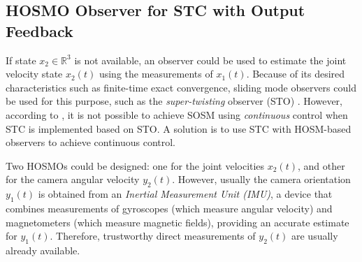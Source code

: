 \subsection{HOSMO Observer for STC with Output Feedback}
\label{sec:STC_output_feedback}

If state $x_2 \in \mathbb{R}^3$ is not available, an observer could be used to estimate the joint velocity state $x_2(t)$ using the measurements of $x_1(t)$.
%
Because of its desired characteristics such as finite-time exact convergence, sliding mode observers 
could be used for this purpose, such as the {\it super-twisting} observer (STO) \cite{Moreno2012}.
%
However, according to \cite{Chalanga2016}, it is not possible to achieve SOSM using {\it continuous} 
control when STC is implemented based on STO. A solution is to use STC with HOSM-based observers to achieve continuous control. 

\begin{remark}
Two HOSMOs could be designed: one for the joint velocities $x_2(t)$, and other for the camera angular velocity $y_2(t)$. However, usually the camera orientation $y_1(t)$ is obtained from an {\it Inertial Measurement Unit (IMU)}, a device that combines measurements of gyroscopes (which measure angular velocity) and magnetometers (which measure magnetic fields), providing an accurate estimate for $y_1(t)$. Therefore, trustworthy direct measurements of $y_2(t)$ are usually already available.
\end{remark}


